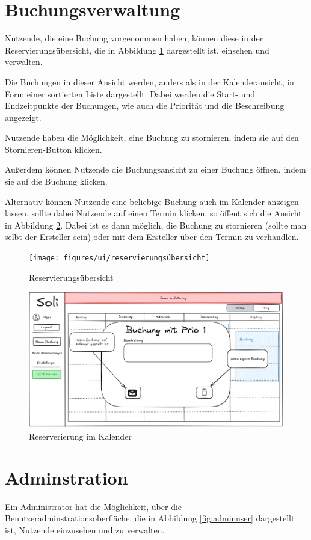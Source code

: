 \section{Buchungsverwaltung}
Nutzende, die eine Buchung vorgenommen haben, können diese in der Reservierungsübersicht,
die in Abbildung \ref{fig:overview} dargestellt ist, einsehen und verwalten.

Die Buchungen in dieser Ansicht werden, anders als in der Kalenderansicht, in Form einer sortierten Liste dargestellt.
Dabei werden die Start- und Endzeitpunkte der Buchungen, wie auch die Priorität und die Beschreibung angezeigt.

Nutzende haben die Möglichkeit, eine Buchung zu stornieren, indem sie auf den Stornieren-Button klicken.

Außerdem können Nutzende die Buchungsansicht zu einer Buchung öffnen, indem sie auf die Buchung klicken.

Alternativ können Nutzende eine beliebige Buchung auch im Kalender anzeigen lassen, sollte dabei Nutzende auf einen Termin klicken, so öffent sich die Ansicht in Abbildung \ref{fig:calendarviewbooking}.
Dabei ist es dann möglich, die Buchung zu stornieren (sollte man selbt der Ersteller sein) oder mit dem Ersteller über den Termin zu verhandlen.

\begin{figure}[ht]
    \texttt{[image: figures/ui/reservierungsübersicht]}
    \caption{Reservierungsübersicht}
    \label{fig:overview}
\end{figure}
\clearpage
\begin{figure}
    \centering
    \includegraphics[scale=0.15]{figures/ui/reservierunginkalendar}
    \caption{Reserverierung im Kalender}
    \label{fig:calendarviewbooking}
\end{figure}

\section{Adminstration}
Ein Administrator hat die Möglichkeit, über die Benutzeradminstrationsoberfläche,
die in Abbildung \ref{fig:adminuser} dargestellt ist, Nutzende einzusehen und zu verwalten.

